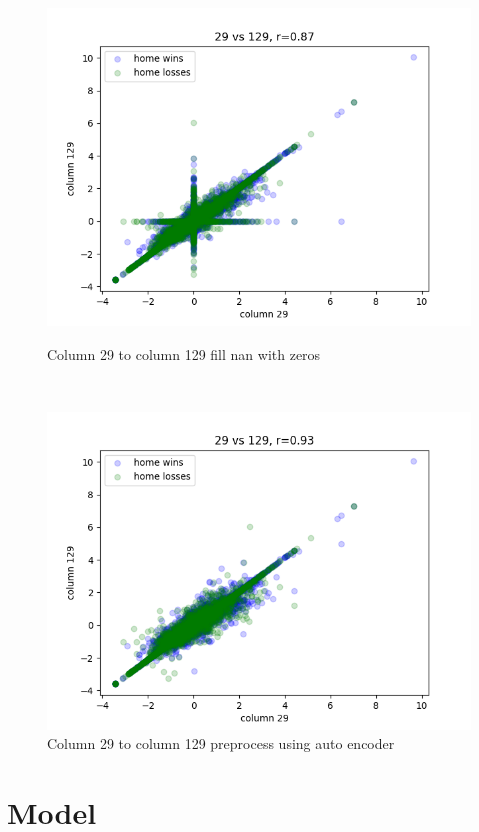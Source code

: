 \documentclass[11pt,a4paper]{article}
\begin{document}
\begin{figure}[ht]
\begin{minipage}{.2\textwidth}
        \centering
        \includegraphics[width=0.8\linewidth]{images/0.87r_29_to_129.png}
        \caption[width=0.8\linewidth]{Column 29 to column 129 fill nan with zeros}
        \label{fig:29-129}
    \end{minipage}%
    \begin{minipage}{.05\textwidth}
        \ 
    \end{minipage}%
    \begin{minipage}{.2\textwidth}
        \centering
        \includegraphics[width=0.8\linewidth]{images/0.93r_29_to_129_recovered.png}
        \caption[width=0.8\linewidth]{Column 29 to column 129 preprocess using auto encoder}
        \label{fig:29-129r}
    \end{minipage}
\end{figure}




\section{Model}
\end{document}
